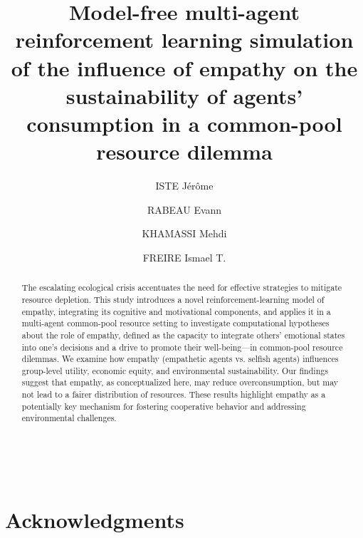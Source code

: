 \documentclass[runningheads]{llncs}
\begin{document}
%
\title{Model-free multi-agent reinforcement learning simulation of the influence of empathy on the sustainability of agents’ consumption in a common-pool resource dilemma}
%
%
\author{ISTE Jérôme \and
RABEAU Evann \and
KHAMASSI Mehdi  \and
FREIRE Ismael T.
}
%
%

%
\maketitle              %
%
\begin{abstract}
The escalating ecological crisis accentuates the need for effective strategies to mitigate resource depletion. This study introduces a novel reinforcement-learning model of empathy, integrating its cognitive and motivational components, and applies it in a multi-agent common-pool resource setting to investigate computational hypotheses about the role of empathy, defined as the capacity to integrate others’ emotional states into one's decisions and a drive to promote their well-being—in common-pool resource dilemmas. We examine how empathy (empathetic agents vs. selfish agents) influences group-level utility, economic equity, and environmental sustainability. Our findings suggest that empathy, as conceptualized here, may reduce overconsumption, but may not lead to a fairer distribution of resources. These results highlight empathy as a potentially key mechanism for fostering cooperative behavior and addressing environmental challenges.

\end{abstract}
%
%
%
\newpage



\newpage





\newpage

~\\

\section*{Acknowledgments}
\end{document}
